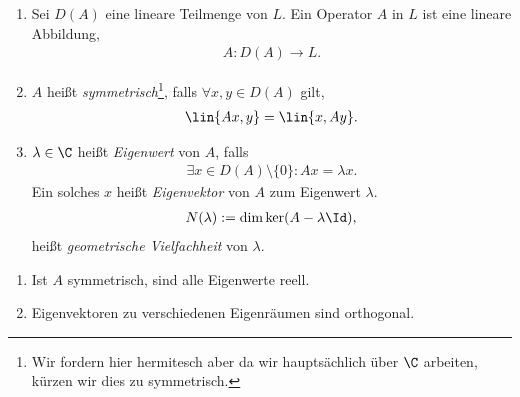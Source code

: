 \begin{defn}
\label{defn:1.14}
\begin{enumerate}[label=\arabic{*}.)]
  \item Sei $D(A)$ eine lineare Teilmenge von $L$. Ein Operator $A$ in $L$ ist
  eine lineare Abbildung,
\begin{align*}
A: D(A) \to L.
\end{align*}
\item $A$ heißt \emph{symmetrisch}\footnote{Wir fordern hier
hermitesch aber da wir hauptsächlich über $\C$ arbeiten, kürzen wir dies zu
symmetrisch.}, falls $\forall x,y\in D(A)$ gilt,
\begin{align*}
\lin{Ax,y} = \lin{x,Ay}.
\end{align*}
\item $\lambda\in\C$ heißt \emph{Eigenwert} von $A$, falls
\begin{align*}
\exists x\in D(A)\setminus\{0\} : Ax = \lambda x.
\end{align*}
Ein solches $x$ heißt \emph{Eigenvektor} von $A$ zum Eigenwert $\lambda$.
\begin{align*}
N(\lambda) := \dim\ker (A-\lambda\Id),
\end{align*}
heißt \emph{geometrische Vielfachheit} von $\lambda$.\fishhere
\end{enumerate}
\end{defn}
\begin{prop}
\label{prop:1.15}
\begin{enumerate}[label=\arabic{*}.)]
  \item Ist $A$ symmetrisch, sind alle Eigenwerte reell.
  \item Eigenvektoren zu verschiedenen Eigenräumen sind orthogonal.\fishhere
\end{enumerate}
\end{prop}

